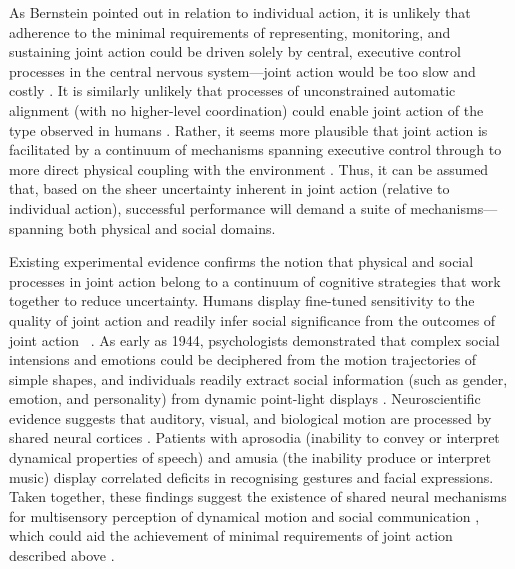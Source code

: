 \begin{CJK}{UTF8}{gbsn}
As Bernstein pointed out in relation to individual action, it is unlikely that adherence to the minimal requirements of representing, monitoring, and sustaining joint action could be driven solely by central, executive control processes in the central nervous system---joint action would be too slow and costly \citep{Dietrich2004b}.  It is similarly unlikely that processes of unconstrained automatic alignment (with no higher-level coordination) could enable joint action of the type observed in humans \citep{Fusaroli2014}.  Rather, it seems more plausible that joint action is facilitated by a continuum of mechanisms spanning executive control through to more direct physical coupling with the environment \citep{Semin2008,Frith2008}.  Thus, it can be assumed that, based on the sheer uncertainty inherent in joint action (relative to individual action), successful performance will demand a suite of mechanisms---spanning both physical and social domains.

Existing experimental evidence confirms the notion that physical and social processes in joint action belong to a continuum of cognitive strategies that work together to reduce uncertainty.  Humans display fine-tuned sensitivity to the quality of joint action and readily infer social significance from the outcomes of joint action ~\citep{Wheatley2016}.  As early as 1944, psychologists \textcite{Heider1944} demonstrated that complex social intensions and emotions could be deciphered from the motion trajectories of simple shapes, and individuals readily extract social information (such as gender, emotion, and personality) from dynamic point-light displays \citep{Atkinson2004,Johansson1973}.  Neuroscientific evidence suggests that auditory, visual, and biological motion are processed by shared neural cortices \citep[e.g., the right superior temporal cortex; see][]{Zatorre2007,Beaucousin2006,Beauchamp2007}. Patients with aprosodia (inability to convey or interpret dynamical properties of speech) and amusia (the inability produce or interpret music) display correlated deficits in recognising gestures and facial expressions.  Taken together, these findings suggest the existence of shared neural mechanisms for multisensory perception of dynamical motion and social communication \citep{Wheatley2012,Wheatley2016}, which could aid the achievement of minimal requirements of joint action described above \citep{Novembre2014,Sebanz2009}.



\end{CJK}
